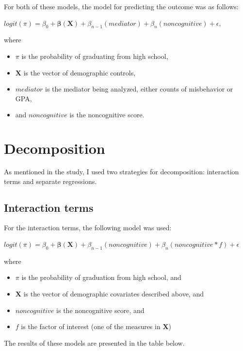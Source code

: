 \documentclass[11pt]{article}
\begin{document}
For both of these models, the model for predicting the outcome was as follows:

\vspace{5mm}
$logit(\pi) = \beta_0 + \boldsymbol{\beta}(\mathbf{X})+ \beta_{n-1}(mediator) + \beta_{n}(noncognitive)+\epsilon,$
\vspace{5mm}

\noindent where
\begin{itemize}\itemsep1pt \parskip0pt 
	\item $\pi$ is the probability of graduating from high school,
	\item $\mathbf{X}$ is the vector of demographic controls,
	\item $mediator$ is the mediator being analyzed, either counts of misbehavior or GPA,
	\item and $noncognitive$ is the noncognitive score.
\end{itemize}

\section{Decomposition}
As mentioned in the study, I used two strategies for decomposition: interaction terms and separate regressions.

\subsection{Interaction terms}
For the interaction terms, the following model was used:

\vspace{5mm}
$logit(\pi) = \beta_0 + \boldsymbol{\beta}(\mathbf{X}) + \beta_{n-1} (noncognitive) +\beta_n(noncognitive*f) + \epsilon$
\vspace{5mm}

\noindent where

\begin{itemize}\itemsep1pt \parskip0pt 
	\item $\pi$ is the probability of graduation from high school, and
	\item $\mathbf{X}$ is the vector of demographic covariates described above, and
	\item $noncognitive$ is the noncognitive score, and
	\item $f$ is the factor of interest (one of the measures in $\mathbf{X}$)
\end{itemize}

The results of these models are presented in the table below.
\end{document}

